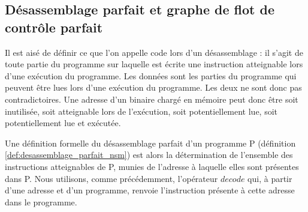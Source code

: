 


\subsection{Désassemblage parfait et graphe de flot de contrôle parfait}
Il est aisé de définir ce que l'on appelle code lors d'un désassemblage : il s'agit de toute partie du programme sur laquelle est écrite une instruction atteignable lors d'une exécution du programme.
Les données sont les parties du programme qui peuvent être lues lors d'une exécution du programme. Les deux ne sont donc pas contradictoires. Une adresse d'un binaire chargé en mémoire peut donc être soit inutilisée, soit atteignable lors de l'exécution, soit potentiellement lue, soit potentiellement lue et exécutée.

\begin{center}
\end{center}

Une définition formelle du désassemblage parfait d'un programme P (définition \ref{def:desassemblage_parfait_nsm}) est alors la détermination de l'ensemble des instructions atteignables de P, munies de l'adresse à laquelle elles sont présentes dans P.
Nous utilisons, comme précédemment, l'opérateur $decode$ qui, à partir d'une adresse et d'un programme, renvoie l'instruction présente à cette adresse dans le programme.

